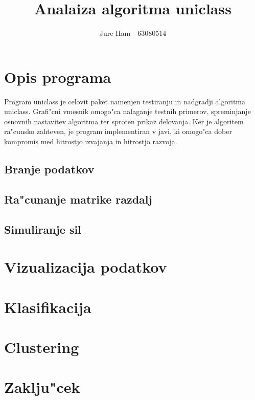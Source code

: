 \documentclass[slovene,11pt]{article}
\title{Analaiza algoritma uniclass}
\author{Jure Ham - 63080514}
\begin{document}
\tableofcontents
\pagebreak

\section{Opis programa}
	Program uniclass je celovit paket namenjen testiranju in nadgradji algoritma uniclass. Grafi"cni vmesnik omogo"ca nalaganje testnih primerov, spreminjanje osnovnih nastavitev algoritma ter sproten prikaz delovanja. Ker je algoritem ra"cunsko zahteven, je program implementiran v javi, ki omogo"ca dober kompromis med hitrostjo izvajanja in hitrostjo razvoja.

	\subsection{Branje podatkov}
	\subsection{Ra"cunanje matrike razdalj}
	\subsection{Simuliranje sil}
	
\section{Vizualizacija podatkov}

\section{Klasifikacija}

\section{Clustering}

\section{Zaklju"cek}
	
\end{document}
